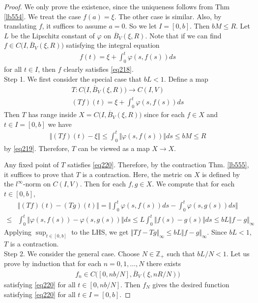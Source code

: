 \documentclass[12pt,b5paper,notitlepage]{article}
\theoremstyle{definition}
\theoremstyle{plain}
\newcommand{\ovl}{\overline}
\newcommand{\Zbb}{\mathbb Z}
\numberwithin{equation}{section}
\begin{document}
\begin{proof}
We only prove the existence, since the uniqueness follows from Thm \ref{lb554}. We treat the case $f(a)=\xi$. The other case is similar. Also, by translating $f$, it suffices to assume $a=0$. So we let $I=[0,b]$. Then $bM\leq R$. Let $L$ be the Lipschitz constant of $\varphi$ on $\ovl B_V(\xi,R)$. Note that if we can find $f\in C\big(I,\ovl B_V(\xi,R)\big)$ satisfying the integral equation
\begin{align}
f(t)=\xi+\int_0^t \varphi(s,f(s))ds  \label{eq220}
\end{align}
for all $t\in I$, then $f$ clearly satisfies \eqref{eq218}.\\[-1ex]

Step 1. We first consider the special case that $bL<1$. Define a map
\begin{gather*}
T:C\big(I,\ovl B_V(\xi,R)\big)\rightarrow C(I,V)\\
(Tf)(t)=\xi+\int_0^t\varphi(s,f(s))ds
\end{gather*}
Then $T$ has range inside $X=C\big(I,\ovl B_V(\xi,R)\big)$ since for each $f\in X$ and $t\in I=[0,b]$ we have
\begin{align}
\Vert (Tf)(t)-\xi\Vert\leq \int_0^t\Vert\varphi(s,f(s))\Vert ds\leq bM\leq R
\end{align}
by \eqref{eq219}. Therefore, $T$ can be viewed as a map $X\rightarrow X$. 

Any fixed point of $T$ satisfies \eqref{eq220}. Therefore, by the contraction Thm. \ref{lb555}, it suffices to prove that $T$ is a contraction. Here, the metric on $X$ is defined by the $l^\infty$-norm on $C(I,V)$. Then for each $f,g\in X$. We compute that for each $t\in[0,b]$,
\begin{align*}
&\Vert (Tf)(t)-(Tg)(t)\Vert=\Big\Vert\int_0^t \varphi(s,f(s))ds-\int_0^t\varphi(s,g(s))ds\Big\Vert\\
\leq&\int_0^t\big\Vert\varphi(s,f(s))-\varphi(s,g(s))\big\Vert ds\leq L\int_0^t\big\Vert f(s)-g(s)\big\Vert ds\leq bL\Vert f-g\Vert_\infty
\end{align*}
Applying $\sup_{t\in[0,b]}$ to the LHS, we get $\Vert Tf-Tg\Vert_\infty\leq bL\Vert f-g\Vert_\infty$. Since $bL<1$, $T$ is a contraction.\\[-1ex]

Step 2. We consider the general case. Choose $N\in\Zbb_+$ such that $bL/N<1$. Let us prove by induction that for each $n=0,1,\dots,N$ there exists
\begin{align*}
f_n\in C\big([0,nb/N],\ovl B_V(\xi,nR/N) \big)
\end{align*}
satisfying \eqref{eq220} for all $t\in[0,nb/N]$. Then $f_N$ gives the desired function satisfying \eqref{eq220} for all $t\in I=[0,b]$.


\end{proof}
\end{document}
